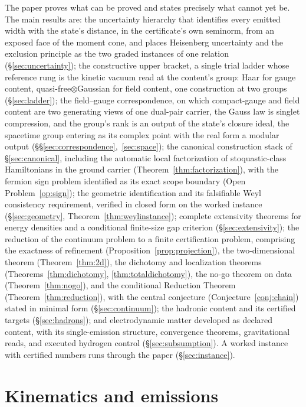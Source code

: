 \documentclass[11pt]{article}
\theoremstyle{definition}
\theoremstyle{remark}
\begin{document}
The paper proves what can be proved and states precisely what cannot yet
be.  The main results are: the uncertainty hierarchy that identifies every
emitted width with the state's distance, in the certificate's own seminorm,
from an exposed face of the moment cone, and places Heisenberg uncertainty
and the exclusion principle as the two graded instances of one relation
(\S\ref{sec:uncertainty}); the constructive upper bracket, a single trial
ladder whose reference rung is the kinetic vacuum read at the content's
group: Haar for gauge content, quasi-free$\otimes$Gaussian for field
content, one construction at two groups (\S\ref{sec:ladder}); the
field--gauge correspondence, on which compact-gauge and field content
are two generating views of one dual-pair carrier, the Gauss law is
singlet compression, and the group's rank is an output of the state's
closure ideal, the spacetime group entering as its complex point with
the real form a modular output
(\S\S\ref{sec:correspondence},~\ref{sec:space}); the canonical
construction stack of \S\ref{sec:canonical}, including the automatic local
factorization of
stoquastic-class Hamiltonians in the ground carrier
(Theorem~\ref{thm:factorization}), with the fermion sign problem
identified as its exact scope boundary (Open Problem~\ref{op:sign}); the geometric identification and its
falsifiable Weyl consistency requirement, verified in closed form on
the worked instance (\S\ref{sec:geometry},
Theorem~\ref{thm:weylinstance}); complete
extensivity theorems for energy densities and a conditional finite-size
gap criterion (\S\ref{sec:extensivity}); the reduction of the continuum
problem to a finite certification problem, comprising the exactness of
refinement (Proposition~\ref{prop:projection}), the two-dimensional
theorem (Theorem~\ref{thm:2d}), the dichotomy and localization theorems
(Theorems~\ref{thm:dichotomy}, \ref{thm:totaldichotomy}), the no-go
theorem on data (Theorem~\ref{thm:nogo}), and the conditional Reduction
Theorem (Theorem~\ref{thm:reduction}), with the central conjecture
(Conjecture~\ref{conj:chain}) stated in minimal form
(\S\ref{sec:continuum}); the hadronic content and its certified targets
(\S\ref{sec:hadrons}); and electrodynamic matter developed as declared
content, with its single-emission structure, convergence theorems,
gravitational reads, and executed hydrogen control
(\S\ref{sec:subsumption}).  A worked
instance with certified numbers runs through the paper
(\S\ref{sec:instance}).

\section{Kinematics and emissions}\label{sec:kinematics}
\end{document}
